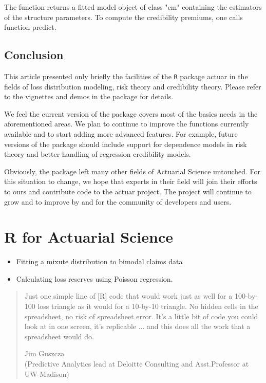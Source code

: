 \documentclass[12pt]{article}
\begin{document}
The function returns a fitted model object of class "cm" containing the estimators of the structure parameters. To compute the credibility premiums, one calls function predict.

\subsection{Conclusion}

This article presented only briefly the facilities of the \texttt{R} package actuar in the fields of loss distribution modeling, risk theory and credibility theory. Please refer to the vignettes and demos in the package for details.

We feel the current version of the package covers most of the basics needs in the aforementioned areas. We plan to continue to improve the functions currently available and to start adding more advanced features. For example, future versions of the package should include support for dependence models in risk theory and better handling of regression credibility models.

Obviously, the package left many other fields of Actuarial Science untouched. For this situation to change, we hope that experts in their field will join their efforts to ours and contribute code to the actuar project. The project will continue to grow and to improve by and for the community of developers and users.


\newpage
\section{R for Actuarial Science}
\begin{itemize}
\item Fitting a mixute distribution to bimodal claims data
\item Calculating loss reserves using Poisson regression.
\end{itemize}
\begin{quotation}
Just one simple line of [R] code that would work just as well for a 100-by-100 loss triangle as it would for a 10-by-10 triangle. No hidden cells in the spreadsheet, no risk of spreadsheet error. It's a little bit of code you could look at in one screen, it's replicable ... and this does all the work that a spreadsheet would do.

Jim Guszcza \\(Predictive Analytics lead at Deloitte Consulting and Asst.Professor at UW-Madison)
\end{quotation}
\end{document}
